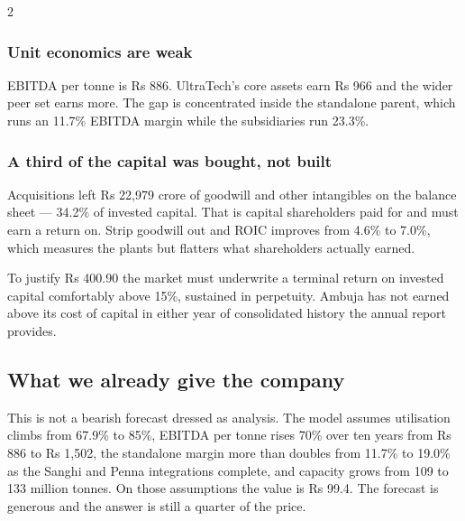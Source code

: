 \begin{paracol}{2}
\subsubsection{Unit economics are weak} EBITDA per tonne is Rs 886. UltraTech's
core assets earn Rs 966 and the wider peer set earns more. The gap is concentrated
inside the standalone parent, which runs an 11.7\% EBITDA margin while the
subsidiaries run 23.3\%.

\subsubsection{A third of the capital was bought, not built} Acquisitions left
Rs 22,979 crore of goodwill and other intangibles on the balance sheet — 34.2\% of
invested capital. That is capital shareholders paid for and must earn a return on.
Strip goodwill out and ROIC improves from 4.6\% to 7.0\%, which measures the plants
but flatters what shareholders actually earned.

\begin{keybox}
To justify Rs 400.90 the market must underwrite a terminal return on invested
capital comfortably above 15\%, sustained in perpetuity. Ambuja has not earned
above its cost of capital in either year of consolidated history the annual report
provides.
\end{keybox}

\subsection{What we already give the company}

This is not a bearish forecast dressed as analysis. The model assumes utilisation
climbs from 67.9\% to 85\%, EBITDA per tonne rises 70\% over ten years from Rs 886
to Rs 1,502, the standalone margin more than doubles from 11.7\% to 19.0\% as the
Sanghi and Penna integrations complete, and capacity grows from 109 to 133 million
tonnes. On those assumptions the value is Rs 99.4. The forecast is generous and the
answer is still a quarter of the price.

\switchcolumn
{}



\end{paracol}
